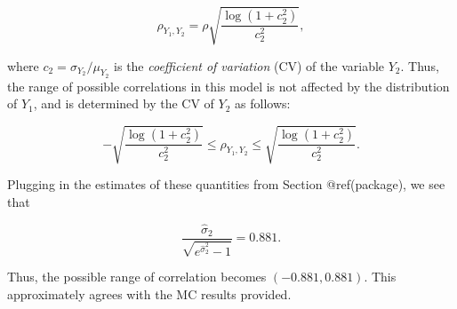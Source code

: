 \documentclass[
]{jss}
\begin{document}
\begin{equation}
\label{eq:kram9}
\rho_{Y_1, Y_2} = \rho \sqrt{\frac{\log(1+c_2^2)}{c_2^2}},
\end{equation}

where \(c_2=\sigma_{Y_2}/\mu_{Y_2}\) is the \emph{coefficient of
variation} (CV) of the variable \(Y_2\). Thus, the range of possible
correlations in this model is not affected by the distribution of
\(Y_1\), and is determined by the CV of \(Y_2\) as follows:

\begin{equation}
\label{eq:kram10}
- \sqrt{\frac{\log(1+c_2^2)}{c_2^2}} \leq \rho_{Y_1, Y_2} \leq \sqrt{\frac{\log(1+c_2^2)}{c_2^2}}. 
\end{equation}

Plugging in the estimates of these quantities from Section
@ref(package), we see that

\begin{equation}
\label{eq:kram11}
\frac{\hat{\sigma}_2}{\sqrt{e^{\hat{\sigma}_2^2} -1}} = 0.881.
\end{equation}

Thus, the possible range of correlation becomes \((-0.881, 0.881)\).
This approximately agrees with the MC results provided.



\end{document}
